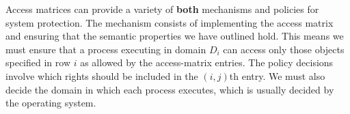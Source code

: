 Access matrices can provide a variety of \textbf{both} mechanisms and policies for system protection.
The mechanism consists of implementing the access matrix and ensuring that the semantic properties we have outlined hold.
This means we must ensure that a process executing in domain $D_{i}$ can access only those objects specified in row $i$ as allowed by the access-matrix entries.
The policy decisions involve which rights should be included in the $(i, j)$th entry.
We must also decide the domain in which each process executes, which is usually decided by the operating system.


